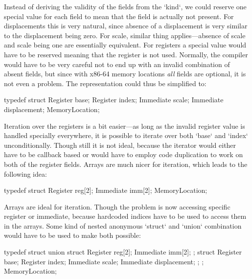 Instead of deriving the validity of the fields from the `kind`, we could reserve
one special value for each field to mean that the field is actually not present.
For displacements this is very natural, since absence of a displacement is very
similar to the displacement being zero. For scale, similar thing applies---absence of
scale and scale being one are essentially equivalent. For registers a special value would
have to be reserved meaning that the register is not used. Normally, the
compiler would have to be very careful not to end up with an invalid combination
of absent fields, but since with x86-64 memory locations {\em all} fields are
optional, it is not even a problem. The representation could thus be simplified
to:

\begtt
typedef struct {
	Register base;
	Register index;
	Immediate scale;
	Immediate displacement;
} MemoryLocation;
\endtt

Iteration over the registers is a bit easier---as long as the invalid register
value is handled specially everywhere, it is possible to iterate over both
`base` and `index` unconditionally. Though still it is not ideal, because the
iterator would either have to be callback based or would have to employ code
duplication to work on both of the register fields. Arrays are much nicer for
iteration, which leads to the following idea:

\begtt
typedef struct {
	Register reg[2];
	Immediate imm[2];
} MemoryLocation;
\endtt

Arrays are ideal for iteration. Though the problem is now accessing specific
register or immediate, because hardcoded indices have to be used to access them
in the arrays. Some kind of nested anonymous `struct` and `union` combination
would have to be used to make both possible:

\begtt
typedef struct {
	union {
		struct {
			Register reg[2];
			Immediate imm[2];
		};
		struct {
			Register base;
			Register index;
			Immediate scale;
			Immediate displacement;
		};
	};
} MemoryLocation;
\endtt

